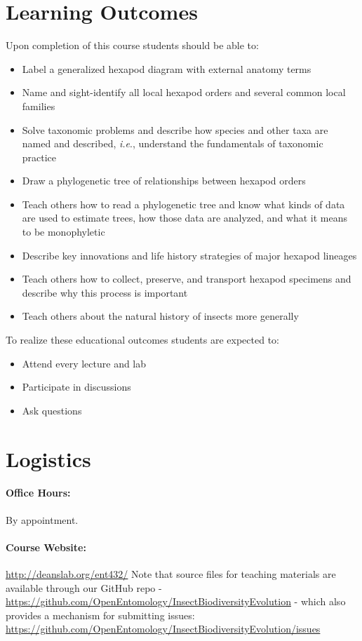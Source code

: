 \documentclass[11pt]{article}
\begin{document}
\section*{Learning Outcomes} 
Upon completion of this course students should be able to:
\begin{itemize}
\item Label a generalized hexapod diagram with external anatomy terms
\item Name and sight-identify all local hexapod orders and several common local families
\item Solve taxonomic problems and describe how species and other taxa are named and described, \textit{i.e}., understand the fundamentals of taxonomic practice
\item Draw a phylogenetic tree of relationships between hexapod orders
\item Teach others how to read a phylogenetic tree and know what kinds of data are used to estimate trees, how those data are analyzed, and what it means to be monophyletic
\item Describe key innovations and life history strategies of major hexapod lineages
\item Teach others how to collect, preserve, and transport hexapod specimens and describe why this process is important
\item Teach others about the natural history of insects more generally
\end{itemize} 

\noindent To realize these educational outcomes students are expected to:
\begin{itemize}
\item Attend every lecture and lab
\item Participate in discussions
\item Ask questions
\end{itemize}

\section*{Logistics} 
\paragraph{Office Hours:} By appointment.

\paragraph{Course Website:} \url{http://deanslab.org/ent432/} Note that source files for teaching materials are available through our GitHub repo - \url{https://github.com/OpenEntomology/InsectBiodiversityEvolution} - which also provides a mechanism for submitting issues: \url{https://github.com/OpenEntomology/InsectBiodiversityEvolution/issues} 
\end{document}
